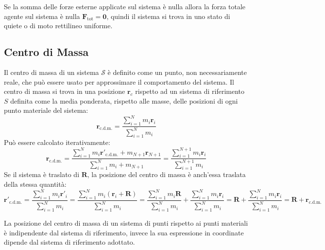 \documentclass{article}
\newcommand{\vect}[1]{\boldsymbol{\mathbf{#1}}}
\numberwithin{equation}{subsection}
\begin{document}
Se la somma delle forze esterne applicate sul sistema 
è nulla allora la forza totale agente sul sistema è nulla $\vect{F}_\mathrm{tot}=\vect{0}$, quindi il sistema 
si trova in uno stato di quiete o di moto rettilineo uniforme. 

\subsection{Centro di Massa}
Il centro di massa di un sistema $\mathscr{S}$ è definito come 
un punto, non necessariamente reale, che può essere usato per approssimare il comportamento del sistema. 
Il centro di massa si trova in una posizione $\vect{r}_c$ 
rispetto ad un sistema di riferimento $S$ definita come la media ponderata, rispetto alle masse, delle posizioni di ogni punto materiale del sistema: 
\begin{equation}
    \vect{r}_{\mathrm{c.d.m.}}=\displaystyle\frac{\sum_{i=1}^{N}m_i\vect{r}_i}{\sum_{i=1}^{N}m_i}
\end{equation}
Può essere calcolato iterativamente:
\begin{equation*}
    \vect{r}_{\mathrm{c.d.m.}}=\displaystyle\frac{\sum_{i=1}^Nm_i\vect{r}'_{\mathrm{c.d.m.}}+m_{N+1}\vect{r}_{N+1}}{\sum_{i=1}^Nm_i+m_{N+1}}=\frac{\sum_{i=1}^{N+1}m_i\vect{r}_i}{\sum_{i=1}^{N+1}m_i}
\end{equation*}
Se il sistema è traslato di $\vect{R}$, la posizione del 
centro di massa è anch'essa traslata della stessa quantità:
\begin{equation*}
    \vect{r}'_{\mathrm{c.d.m.}}=\displaystyle\frac{\sum_{i=1}^{N}m_i\vect{r}'_i}{\sum_{i=1}^{N}m_i}=\displaystyle\frac{\sum_{i=1}^{N}m_i(\vect{r}_i+\vect{R})}{\sum_{i=1}^{N}m_i}=\displaystyle\frac{\sum_{i=1}^{N}m_i\vect{R}}{\sum_{i=1}^{N}m_i}+\displaystyle\frac{\sum_{i=1}^{N}m_i\vect{r}_i}{\sum_{i=1}^{N}m_i}=\vect{R}+\displaystyle\frac{\sum_{i=1}^{N}m_i\vect{r}_i}{\sum_{i=1}^{N}m_i}=\vect{R}+\vect{r}_{\mathrm{c.d.m.}}
\end{equation*}

La posizione del centro di massa di un sistema di punti rispetto ai punti materiali è indipendente dal sistema di riferimento, invece la sua espressione in coordinate 
dipende dal sistema di riferimento adottato. 
\end{document}
